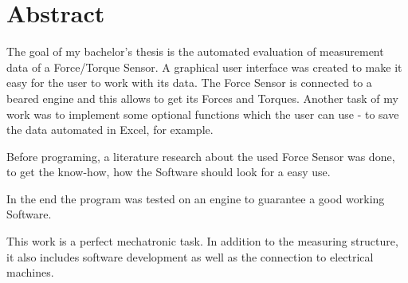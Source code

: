 \section*{Abstract}
\thispagestyle{prolog}
\bigskip

The goal of my bachelor's thesis is the automated evaluation of measurement data of a Force/Torque Sensor. A graphical user interface was created to make it easy for the user to work with its data. The Force Sensor is connected to a beared engine and this allows to get its Forces and Torques. Another task of my work was to implement some optional functions which the user can use - to save the data automated in Excel, for example.

Before programing, a literature research about the used Force Sensor was done, to get the know-how, how the Software should look for a easy use.

In the end the program was tested on an engine to guarantee a good working Software.

This work is a perfect mechatronic task. In addition to the measuring structure, it also includes software development as well as the connection to electrical machines.
\hbox{ }
\clearpage